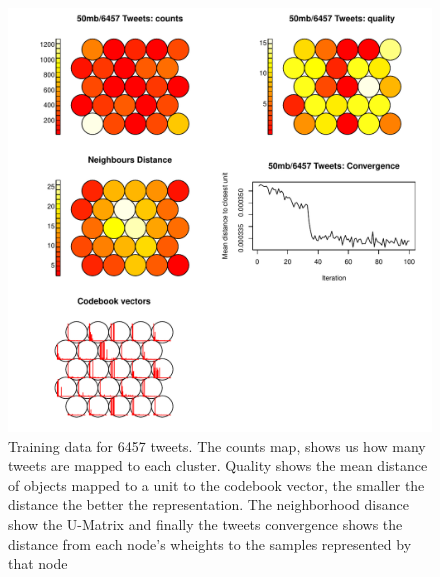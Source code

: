 \appendix
\label{ch:rsom_training}
\begin{figure}[htpb]
  \centering
  \includegraphics[width=0.8\linewidth]{./images/50mb_6457tweets_dataset.pdf}
  \caption{Training data for 6457 tweets. The counts map, shows us how many tweets are mapped to each cluster. Quality shows the mean distance of objects mapped to a unit to the codebook vector, the smaller the distance the better the representation. The neighborhood disance show the U-Matrix and finally the tweets convergence shows the distance from each node's wheights to the samples represented by that node }
  \label{fig:somr_images}
\end{figure}
